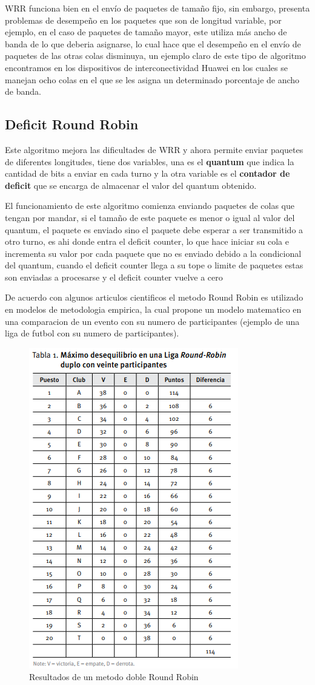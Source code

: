 \documentclass[conference,letterpaper]{IEEEtran}
\begin{document}
WRR funciona bien en el envío de paquetes de tamaño fijo, sin embargo,
presenta problemas de desempeño en los paquetes que son de longitud variable, por ejemplo, en el caso de paquetes de tamaño mayor, este utiliza más ancho de banda de lo que deberia asignarse, lo cual hace que el desempeño en el envío de paquetes de las otras colas disminuya, un ejemplo claro de este tipo de algoritmo encontramos en los dispositivos de interconectividad Huawei en los cuales se manejan ocho colas en el que se les asigna un determinado porcentaje de ancho de banda.

\subsection{Deficit Round Robin}
Este algoritmo mejora las dificultades de WRR y ahora permite enviar paquetes de diferentes longitudes, tiene dos variables, una es el \textbf{quantum} que indica la cantidad de bits a enviar en cada turno y la otra variable es el \textbf{contador de deficit} que se encarga de almacenar el valor del quantum obtenido.

El funcionamiento de este algoritmo comienza enviando paquetes de colas que tengan por mandar, si el tamaño de este paquete es menor o igual al valor del quantum, el paquete es enviado sino el paquete debe esperar a ser transmitido a otro turno, es ahi donde entra el deficit counter, lo que hace iniciar su cola e incrementa su valor por cada paquete que no es enviado debido a la condicional del quantum, cuando el deficit counter llega a su tope o limite de paquetes estas son enviadas a procesarse y el deficit counter vuelve a cero


De acuerdo con algunos articulos cientificos el metodo Round Robin es utilizado en modelos de metodologia empirica, la cual propone un modelo matematico en una comparacion de un evento con su numero de participantes (ejemplo de una liga de futbol con su numero de participantes).

\begin{figure}[thpb]
    \centering
    \includegraphics[width=0.55\linewidth]{tabla.png}
    \caption{Resultados de un metodo doble Round Robin}
    \label{fig:tabla}
\end{figure}
\end{document}
